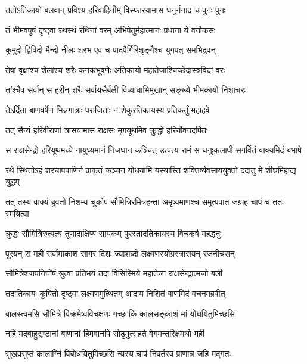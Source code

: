 \twolineshloka
{ततोऽतिकायो बलवान् प्रविश्य हरिवाहिनीम्}
{विस्फारयामास धनुर्ननाद च पुनः पुनः} %

\twolineshloka
{तं भीमवपुषं दृष्ट्वा रथस्थं रथिनां वरम्}
{अभिपेतुर्महात्मानः प्रधाना ये वनौकसः} %

\twolineshloka
{कुमुदो द्विविदो मैन्दो नीलः शरभ एव च}
{पादपैर्गिरिशृङ्गैश्च युगपत् समभिद्रवन्} %

\twolineshloka
{तेषां वृक्षांश्च शैलांश्च शरैः कनकभूषणैः}
{अतिकायो महातेजाश्चिच्छेदास्त्रविदां वरः} %

\twolineshloka
{तांश्चैव सर्वान् स हरीन् शरैः सर्वायसैर्बली}
{विव्याधाभिमुखान् सङ्ख्ये भीमकायो निशाचरः} %

\twolineshloka
{तेऽर्दिता बाणवर्षेण भिन्नगात्राः पराजिताः}
{न शेकुरतिकायस्य प्रतिकर्तुं महाहवे} %

\twolineshloka
{तत् सैन्यं हरिवीराणां त्रासयामास राक्षसः}
{मृगयूथमिव क्रुद्धो हरिर्यौवनदर्पितः} %

\twolineshloka
{स राक्षसेन्द्रो हरियूथमध्ये नायुध्यमानं निजघान कञ्चित्}
{उत्पत्य रामं स धनुःकलापी सगर्वितं वाक्यमिदं बभाषे} %

\twolineshloka
{रथे स्थितोऽहं शरचापपाणिर्न प्राकृतं कञ्चन योधयामि}
{यस्यास्ति शक्तिर्व्यवसाययुक्तो ददातु मे शीघ्रमिहाद्य युद्धम्} %

\twolineshloka
{तत् तस्य वाक्यं ब्रुवतो निशम्य चुकोप सौमित्रिरमित्रहन्ता}
{अमृष्यमाणश्च समुत्पपात जग्राह चापं च ततः स्मयित्वा} %

\twolineshloka
{क्रुद्धः सौमित्रिरुत्पत्य तूणादाक्षिप्य सायकम्}
{पुरस्तादतिकायस्य विचकर्ष महद्धनुः} %

\twolineshloka
{पूरयन् स महीं सर्वामाकाशं सागरं दिशः}
{ज्याशब्दो लक्ष्मणस्योग्रस्त्रासयन् रजनीचरान्} %

\twolineshloka
{सौमित्रेश्चापनिर्घोषं श्रुत्वा प्रतिभयं तदा}
{विसिस्मिये महातेजा राक्षसेन्द्रात्मजो बली} %

\twolineshloka
{तदातिकायः कुपितो दृष्ट्वा लक्ष्मणमुत्थितम्}
{आदाय निशितं बाणमिदं वचनमब्रवीत्} %

\twolineshloka
{बालस्त्वमसि सौमित्रे विक्रमेष्वविचक्षणः}
{गच्छ किं कालसङ्काशं मां योधयितुमिच्छसि} %

\twolineshloka
{नहि मद्बाहुसृष्टानां बाणानां हिमवानपि}
{सोढुमुत्सहते वेगमन्तरिक्षमथो मही} %

\twolineshloka
{सुखप्रसुप्तं कालाग्निं विबोधयितुमिच्छसि}
{न्यस्य चापं निवर्तस्व प्राणान्न जहि मद्गतः} %


